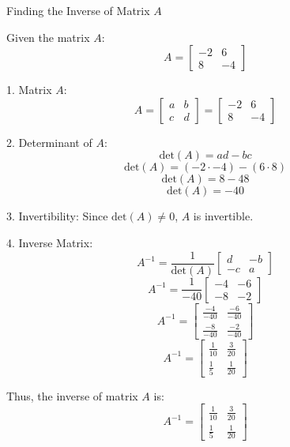 Finding the Inverse of Matrix \( A \)

Given the matrix \( A \):
\[ A = \begin{bmatrix} -2 & 6 \\ 8 & -4 \end{bmatrix} \]

1. Matrix \( A \):
\[ A = \begin{bmatrix} a & b \\ c & d \end{bmatrix} = \begin{bmatrix} -2 & 6 \\ 8 & -4 \end{bmatrix} \]

2. Determinant of \( A \):
\[ \text{det}(A) = ad - bc \]
\[ \text{det}(A) = (-2 \cdot -4) - (6 \cdot 8) \]
\[ \text{det}(A) = 8 - 48 \]
\[ \text{det}(A) = -40 \]

3. Invertibility:
Since \(\text{det}(A) \neq 0\), \( A \) is invertible.

4. Inverse Matrix:
\[ A^{-1} = \frac{1}{\text{det}(A)} \begin{bmatrix} d & -b \\ -c & a \end{bmatrix} \]
\[ A^{-1} = \frac{1}{-40} \begin{bmatrix} -4 & -6 \\ -8 & -2 \end{bmatrix} \]
\[ A^{-1} = \begin{bmatrix} \frac{-4}{-40} & \frac{-6}{-40} \\ \frac{-8}{-40} & \frac{-2}{-40} \end{bmatrix} \]
\[ A^{-1} = \begin{bmatrix} \frac{1}{10} & \frac{3}{20} \\ \frac{1}{5} & \frac{1}{20} \end{bmatrix} \]

Thus, the inverse of matrix \( A \) is:
\[ A^{-1} = \begin{bmatrix} \frac{1}{10} & \frac{3}{20} \\ \frac{1}{5} & \frac{1}{20} \end{bmatrix} \]
